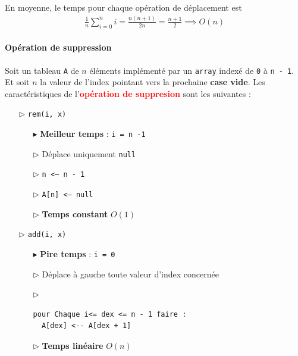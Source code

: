 \documentclass{report}
\begin{document}
\begin{multicols*}{3}
  En moyenne, le temps pour chaque opération de déplacement est 
  \begin{align*}
      \frac{1}{n}\sum_{i=0}^{n }i = \frac{n(n+1)}{2n} = \frac{n+1}{2} \implies O(n)   
  \end{align*}




  \paragraph{Opération de suppression}
  Soit un tableau \texttt{A} de $n$ éléments implémenté 
  par un \texttt{array} indexé de \texttt{0} 
  à \texttt{n - 1}. Et soit $n$ la valeur 
  de l'index pointant vers la prochaine \textbf{case vide}. 
  Les caractéristiques de l'\textcolor{red}{\textbf{opération de suppresion}} 
  sont les suivantes :

  \begin{itemize}
    \item [$\rhd$ ] \texttt{rem(i, \textcolor{myb}{x})}  
      \begin{itemize}
        \item [$\blacktriangleright$ ] \textbf{Meilleur temps} : 
          \texttt{i = n -1} 
        \item [$\rhd$ ] Déplace uniquement \texttt{null}  
        \item [$\rhd$ ] \texttt{n <--- n - 1}     
        \item [$\rhd$ ] \texttt{A[n] <--- null}     
        \item [$\rhd$ ] \textbf{Temps constant} $O(1)$  
      \end{itemize}
  \end{itemize}


  \begin{itemize}
    \item [$\rhd$ ] \texttt{add(i, \textcolor{myb}{x})}  
      \begin{itemize}
        \item [$\blacktriangleright$ ] \textbf{Pire temps} : 
          \texttt{i = 0} 
        \item [$\rhd$ ] Déplace à gauche toute valeur d'index concernée     
        \item [$\rhd$ ] 
          \begin{lstlisting}
pour Chaque i<= dex <= n - 1 faire :
  A[dex] <-- A[dex + 1]             
          \end{lstlisting}
        \item [$\rhd$ ] \textbf{Temps linéaire} $O(n)$  
      \end{itemize}
  \end{itemize}


\end{multicols*}
\end{document}
